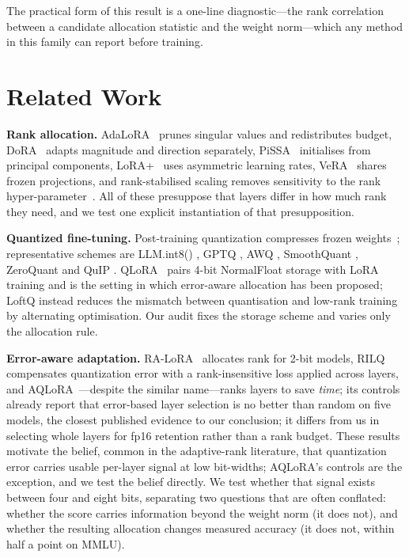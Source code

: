 \documentclass[preprint,12pt]{elsarticle}
\begin{document}
The practical form of this result is a one-line diagnostic---the rank correlation between a candidate allocation statistic and the weight norm---which any method in this family can report before training.

\section{Related Work}
\label{sec:related}

\textbf{Rank allocation.} AdaLoRA~\citep{zhang2023adalora} prunes singular values and redistributes budget, DoRA~\citep{liu2024dora} adapts magnitude and direction separately, PiSSA~\citep{meng2024pissa} initialises from principal components, LoRA+~\citep{hayou2024loraplus} uses asymmetric learning rates, VeRA~\citep{kopiczko2024vera} shares frozen projections, and rank-stabilised scaling removes sensitivity to the rank hyper-parameter~\citep{kalajdzievski2023rslora}. All of these presuppose that layers differ in how much rank they need, and we test one explicit instantiation of that presupposition.

\textbf{Quantized fine-tuning.} Post-training quantization compresses frozen weights~\citep{nagel2021whitepaper,gholami2021survey}; representative schemes are LLM.int8() \citep{dettmers2022llmint8}, GPTQ \citep{frantar2023gptq}, AWQ \citep{lin2024awq}, SmoothQuant \citep{xiao2023smoothquant}, ZeroQuant \citep{yao2022zeroquant} and QuIP \citep{chee2023quip}. QLoRA~\citep{dettmers2023qlora} pairs 4-bit NormalFloat storage with LoRA training and is the setting in which error-aware allocation has been proposed; LoftQ \citep{li2024loftq} instead reduces the mismatch between quantisation and low-rank training by alternating optimisation. Our audit fixes the storage scheme and varies only the allocation rule.

\textbf{Error-aware adaptation.} RA-LoRA~\citep{kim2024ralora} allocates rank for 2-bit models, RILQ~\citep{lee2025rilq} compensates quantization error with a rank-insensitive loss applied across layers, and AQLoRA~\citep{islam2026aqlora}---despite the similar name---ranks layers to save \emph{time}; its controls already report that error-based layer selection is no better than random on five models, the closest published evidence to our conclusion; it differs from us in selecting whole layers for fp16 retention rather than a rank budget. These results motivate the belief, common in the adaptive-rank literature, that quantization error carries usable per-layer signal at low bit-widths; AQLoRA's controls are the exception, and we test the belief directly. We test whether that signal exists between four and eight bits, separating two questions that are often conflated: whether the score carries information beyond the weight norm (it does not), and whether the resulting allocation changes measured accuracy (it does not, within half a point on MMLU).
\end{document}
